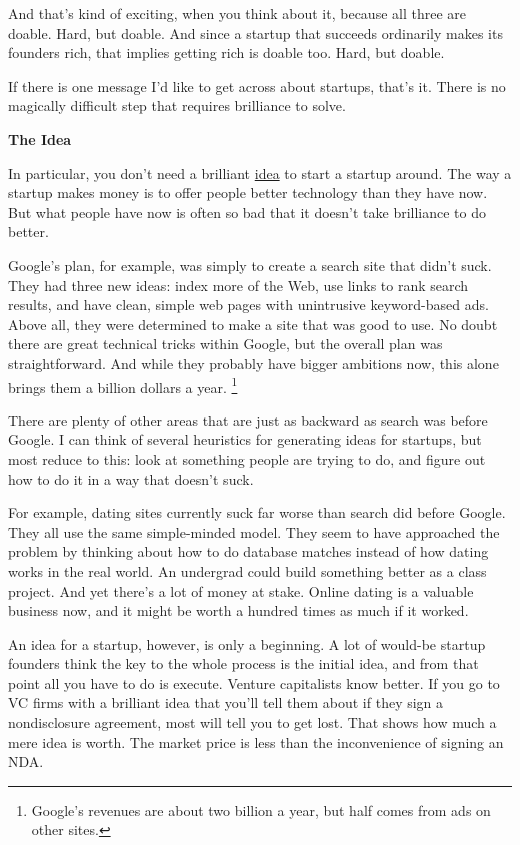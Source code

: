 \documentclass[12pt]{book}
\begin{document}
And that's kind of exciting, when you think about it, because all three
are doable. Hard, but doable. And since a startup that succeeds
ordinarily makes its founders rich, that implies getting rich is doable
too. Hard, but doable.

If there is one message I'd like to get across about startups, that's
it. There is no magically difficult step that requires brilliance to
solve.

\textbf{The Idea}

In particular, you don't need a brilliant \href{ideas.html}{idea} to
start a startup around. The way a startup makes money is to offer people
better technology than they have now. But what people have now is often
so bad that it doesn't take brilliance to do better.

Google's plan, for example, was simply to create a search site that
didn't suck. They had three new ideas: index more of the Web, use links
to rank search results, and have clean, simple web pages with
unintrusive keyword-based ads. Above all, they were determined to make a
site that was good to use. No doubt there are great technical tricks
within Google, but the overall plan was straightforward. And while they
probably have bigger ambitions now, this alone brings them a billion
dollars a year. \footnote{Google's revenues are about two billion a year, but half comes
from ads on other sites.}

There are plenty of other areas that are just as backward as search was
before Google. I can think of several heuristics for generating ideas
for startups, but most reduce to this: look at something people are
trying to do, and figure out how to do it in a way that doesn't suck.

For example, dating sites currently suck far worse than search did
before Google. They all use the same simple-minded model. They seem to
have approached the problem by thinking about how to do database matches
instead of how dating works in the real world. An undergrad could build
something better as a class project. And yet there's a lot of money at
stake. Online dating is a valuable business now, and it might be worth a
hundred times as much if it worked.

An idea for a startup, however, is only a beginning. A lot of would-be
startup founders think the key to the whole process is the initial idea,
and from that point all you have to do is execute. Venture capitalists
know better. If you go to VC firms with a brilliant idea that you'll
tell them about if they sign a nondisclosure agreement, most will tell
you to get lost. That shows how much a mere idea is worth. The market
price is less than the inconvenience of signing an NDA.
\end{document}
